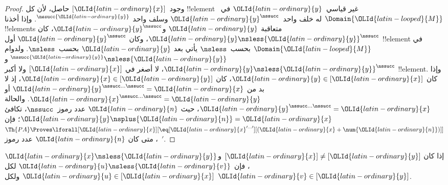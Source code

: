 \documentclass[../../../include/open-logic-section]{subfiles}
\begin{document}
\begin{proof}
وجود~$[{\OLId{latin-ordinary}{x}}]$ حاصل، لأن كل !!{element} غير قياسي~${\OLId{latin-ordinary}{y}}$
في~$\Domain{{\OLId{latin-looped}{M}}}$ له خلف واحد~${\OLId{latin-ordinary}{y}}^\nssucc$ وسلف واحد
$^\nssucc {\OLId{latin-ordinary}{y}}$. وإذا أخذنا !!{element}s متعاقبة ${\OLId{latin-ordinary}{y}}$ و${\OLId{latin-ordinary}{y}}^\nssucc$،
كان ${\OLId{latin-ordinary}{y}} \nsless {\OLId{latin-ordinary}{y}}^\nssucc$، وكان ${\OLId{latin-ordinary}{y}}^\nssucc$ أول !!{element}
في $\Domain{{\OLId{latin-looped}{M}}}$ بحسب~$\nsless$ يأتي بعد ${\OLId{latin-ordinary}{y}}$ بحسب~$\nsless$.
ولدوام $^\nssucc {\OLId{latin-ordinary}{y}} \nsless {\OLId{latin-ordinary}{y}}$ و${\OLId{latin-ordinary}{y}} \nsless {\OLId{latin-ordinary}{y}}^\nssucc$،
لا أصغر في $[{\OLId{latin-ordinary}{x}}]$ ولا أكبر !!{element}. وإذا كان
${\OLId{latin-ordinary}{y}} \in [{\OLId{latin-ordinary}{x}}]$، كان ${\OLId{latin-ordinary}{x}} \in [{\OLId{latin-ordinary}{y}}]$، إذ لا بد من
${\OLId{latin-ordinary}{y}}^{\nssucc\dots\nssucc} = {\OLId{latin-ordinary}{x}}$ أو
${\OLId{latin-ordinary}{x}}^{\nssucc\dots\nssucc} = {\OLId{latin-ordinary}{y}}$. والحالة
${\OLId{latin-ordinary}{y}}^{\nssucc\dots\nssucc} = {\OLId{latin-ordinary}{x}}$، حيث ${\OLId{latin-ordinary}{n}}$ عدد رموز~$\nssucc$،
تكافئ ${\OLId{latin-ordinary}{y}} \nsplus {\OLId{latin-ordinary}{n}} = {\OLId{latin-ordinary}{x}}$؛ فإن
$\Th{PA} \Proves \lforall[{\OLId{latin-ordinary}{x}}][\eq[{\OLId{latin-ordinary}{x}}^{\prime\dots\prime}][({\OLId{latin-ordinary}{x}} +
    \num{{\OLId{latin-ordinary}{n}}})]]$، متى كان ${\OLId{latin-ordinary}{n}}$ عدد رموز~$\prime$.
\end{proof}

\begin{prop}
إذا كان $[{\OLId{latin-ordinary}{x}}] \neq [{\OLId{latin-ordinary}{y}}]$ و${\OLId{latin-ordinary}{x}} \nsless {\OLId{latin-ordinary}{y}}$، فإن ${\OLId{latin-ordinary}{u}} \nsless {\OLId{latin-ordinary}{v}}$ لكل
${\OLId{latin-ordinary}{u}} \in [{\OLId{latin-ordinary}{x}}]$ ولكل ${\OLId{latin-ordinary}{v}} \in [{\OLId{latin-ordinary}{y}}]$.
\end{prop}
\end{document}
